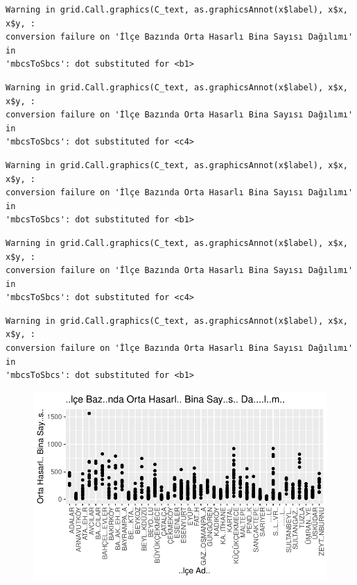 \documentclass[
  11pt,
  a4paper,
  DIV=11,
  numbers=noendperiod]{scrartcl}
\begin{document}
\begin{verbatim}
Warning in grid.Call.graphics(C_text, as.graphicsAnnot(x$label), x$x, x$y, :
conversion failure on 'İlçe Bazında Orta Hasarlı Bina Sayısı Dağılımı' in
'mbcsToSbcs': dot substituted for <b1>
\end{verbatim}

\begin{verbatim}
Warning in grid.Call.graphics(C_text, as.graphicsAnnot(x$label), x$x, x$y, :
conversion failure on 'İlçe Bazında Orta Hasarlı Bina Sayısı Dağılımı' in
'mbcsToSbcs': dot substituted for <c4>
\end{verbatim}

\begin{verbatim}
Warning in grid.Call.graphics(C_text, as.graphicsAnnot(x$label), x$x, x$y, :
conversion failure on 'İlçe Bazında Orta Hasarlı Bina Sayısı Dağılımı' in
'mbcsToSbcs': dot substituted for <b1>
\end{verbatim}

\begin{verbatim}
Warning in grid.Call.graphics(C_text, as.graphicsAnnot(x$label), x$x, x$y, :
conversion failure on 'İlçe Bazında Orta Hasarlı Bina Sayısı Dağılımı' in
'mbcsToSbcs': dot substituted for <c4>
\end{verbatim}

\begin{verbatim}
Warning in grid.Call.graphics(C_text, as.graphicsAnnot(x$label), x$x, x$y, :
conversion failure on 'İlçe Bazında Orta Hasarlı Bina Sayısı Dağılımı' in
'mbcsToSbcs': dot substituted for <b1>
\end{verbatim}

\begin{figure}[H]

{\centering \includegraphics{project_files/figure-pdf/unnamed-chunk-3-3.pdf}

}

\end{figure}
\end{document}
